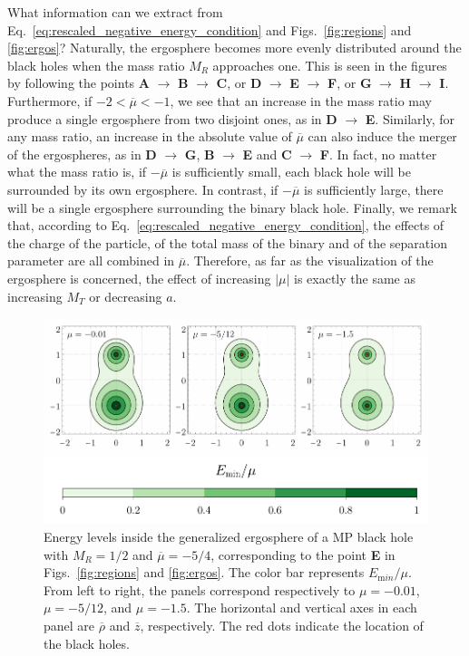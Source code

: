 What information can we extract from Eq.~\eqref{eq:rescaled_negative_energy_condition} and Figs.~\ref{fig:regions} and \ref{fig:ergos}? Naturally, the ergosphere becomes more evenly distributed around the black holes when the mass ratio $M_R$ approaches one. This is seen in the figures by following the points \textbf{A} $\rightarrow$ \textbf{B} $\rightarrow$ \textbf{C}, or \textbf{D} $\rightarrow$ \textbf{E} $\rightarrow$ \textbf{F}, or \textbf{G} $\rightarrow$ \textbf{H} $\rightarrow$ \textbf{I}. Furthermore, if $-2 < \overline \mu < -1$, we see that an increase in the mass ratio may produce a single ergosphere from two disjoint ones, as in \textbf{D} $\rightarrow$ \textbf{E}. Similarly, for any mass ratio, an increase in the absolute value of $\overline \mu$ can also induce the merger of the ergospheres, as in \textbf{D} $\rightarrow$ \textbf{G}, \textbf{B} $\rightarrow$ \textbf{E} and \textbf{C} $\rightarrow$ \textbf{F}. In fact, no matter what the mass ratio is, if $-\overline \mu$ is sufficiently small, each black hole will be surrounded by its own ergosphere. In contrast, if $-\overline \mu$ is sufficiently large, there will be a single ergosphere surrounding the binary black hole. Finally, we remark that, according to Eq.~\eqref{eq:rescaled_negative_energy_condition}, the effects of the charge of the particle, of the total mass of the binary and of the separation parameter are all combined in $\overline \mu$. Therefore, as far as the visualization of the ergosphere is concerned, the effect of increasing $|\mu|$ is exactly the same as increasing $M_T$ or decreasing $a$.



\begin{figure}[!htbp]
    \centering
    \includegraphics[scale=0.70]{img/penrose_binaries/fig3.pdf}
    \caption{Energy levels inside the generalized ergosphere of a MP black hole with $M_R=1/2$ and $\overline \mu = -5/4$, corresponding to the point \textbf{E} in Figs.~\ref{fig:regions} and \ref{fig:ergos}. The color bar represents $E_{\mathrm min}/\mu$. From left to right, the panels correspond respectively to $\mu=-0.01$, $\mu=-5/12$, and $\mu=-1.5$. The horizontal and vertical axes in each panel are $\overline \rho$ and $\overline z$, respectively. The red dots indicate the location of the black holes.}
    \label{fig:energylevels}
\end{figure}

